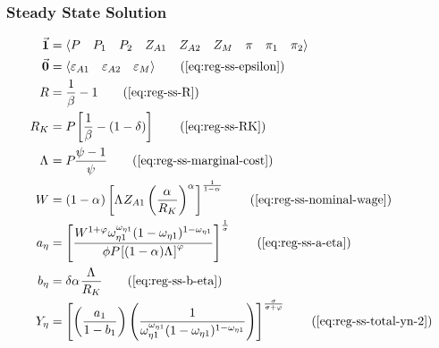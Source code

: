 \documentclass[../thesis.tex]{subfiles}
\begin{document}

	
	
	\subsubsection{Steady State Solution}
	
	\vspace*{-1cm}

	\begin{align}
		\vec{\bm{1}} &= \langle \begin{matrix} P & P_{1} & P_{2} & Z_{A1} & Z_{A2} & Z_{M} & \pi & \pi_{1} & \pi_{2} \end{matrix} \rangle \label{eq:reg-unity-vector}
		\\
		\vec{\bm{0}} &= \langle \begin{matrix} \varepsilon_{A1} & \varepsilon_{A2} & \varepsilon_{M} \end{matrix} \rangle \tag{\ref{eq:reg-ss-epsilon}}
		\\
		R &= \frac{1}{\beta} - 1 \tag{\ref{eq:reg-ss-R}}
		\\
		R_K &= P_{} \left[ \frac{1}{\beta} - (1-\delta) \right] \tag{\ref{eq:reg-ss-RK}}
		\\
		\Lambda_{} &= P_{} \frac{\psi-1}{\psi} \tag{\ref{eq:reg-ss-marginal-cost}}
		\\
		W &= (1-{\alpha_{}}) \left[ \Lambda_{} Z_{A1} \left( \frac{{\alpha_{}}}{R_K} \right)^{{\alpha_{}}} \right]^\frac{1}{1-{\alpha_{}}} \tag{\ref{eq:reg-ss-nominal-wage}}
		\\ %
		a_{\eta} &= \left[ \frac{W^{1 +\varphi} \omega_{\eta 1}^{\omega_{\eta 1}} (1 -\omega_{\eta 1})^{1 -\omega_{\eta 1}}}{\phi P_{} \left[ (1 -\alpha_{}) \Lambda_{} \right]^{\varphi}} \right]^{\frac{1}{\sigma}} \tag{\ref{eq:reg-ss-a-eta}}
		\\
		b_{\eta} &= \delta {\alpha_{}} \frac{\Lambda_{}}{R_K} \tag{\ref{eq:reg-ss-b-eta}}
		\\
		Y_{\eta} &= \left[ \left( \frac{a_{1}}{1 - b_{1}} \right) \left( \frac{1}{\omega_{\eta 1}^{\omega_{\eta 1}} (1 - \omega_{\eta 1})^{1 - \omega_{\eta 1}}} \right) \right]^{\frac{\sigma}{\sigma + \varphi}} \tag{\ref{eq:reg-ss-total-yn-2}}

\end{align}
\end{document}
